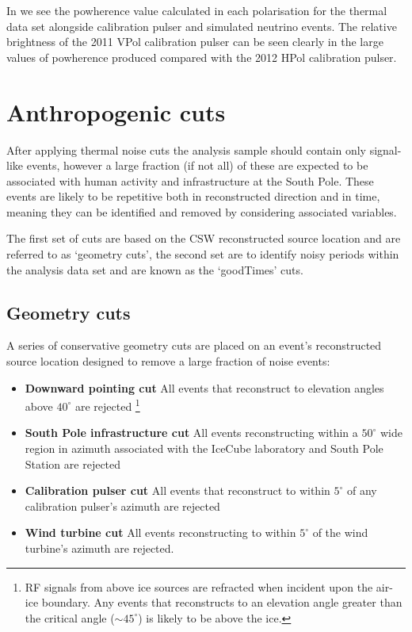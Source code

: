 In  we see the powherence value calculated in each polarisation for the thermal data set alongside calibration pulser and simulated neutrino events. The relative brightness of the 2011 VPol calibration pulser can be seen clearly in the large values of powherence produced compared with the 2012 HPol calibration pulser.


\section{Anthropogenic cuts}
\label{sec:Analysis:Anthropogenic-Cuts}

After applying thermal noise cuts the analysis sample should contain only signal-like events, however a large fraction (if not all) of these are expected to be associated with human activity and infrastructure at the South Pole. These events are likely to be repetitive both in reconstructed direction and in time, meaning they can be identified and removed by considering associated variables.

The first set of cuts are based on the CSW reconstructed source location and are referred to as `geometry cuts', the second set are to identify noisy periods within the analysis data set and are known as the `goodTimes' cuts.

\subsection{Geometry cuts}
\label{sec:Analysis:Anthropogenic-Cuts:Geometry-Cuts}

A series of conservative geometry cuts are placed on an event's reconstructed source location designed to remove a large fraction of noise events:

\begin{itemize}

\item \textbf{Downward pointing cut} All events that reconstruct to elevation angles above $40^\circ$ are rejected \footnote{RF signals from above ice sources are refracted when incident upon the air-ice boundary. Any events that reconstructs to an elevation angle greater than the critical angle ($\sim 45^{\circ}$) is likely to be above the ice.}

\item \textbf{South Pole infrastructure cut} All events reconstructing within a $50^\circ$ wide region in azimuth associated with the IceCube laboratory and South Pole Station are rejected

\item \textbf{Calibration pulser cut} All events that reconstruct to within $5^\circ$ of any calibration pulser's azimuth are rejected

\item \textbf{Wind turbine cut} All events reconstructing to within $5^\circ$ of the wind turbine's azimuth are rejected.

\end{itemize}

